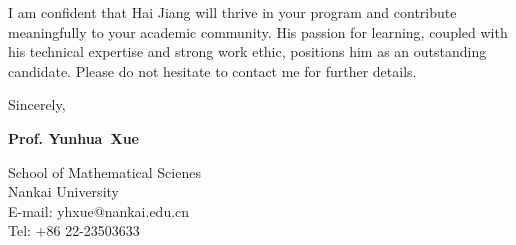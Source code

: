 \documentclass{article}
\begin{document}
I am confident that Hai Jiang will thrive in your program and contribute meaningfully to your academic community. 
His passion for learning, coupled with his technical expertise and strong work ethic, 
positions him as an outstanding candidate. 
Please do not hesitate to contact me for further details.

 


\bigskip %

Sincerely,
\vspace{30pt} %

\textbf{Prof. Yunhua~Xue}\\
\vspace{20pt}

School of Mathematical Scienes\\
Nankai University\\
E-mail: yhxue@nankai.edu.cn~ \\ 
Tel: +86 22-23503633


\end{document}
